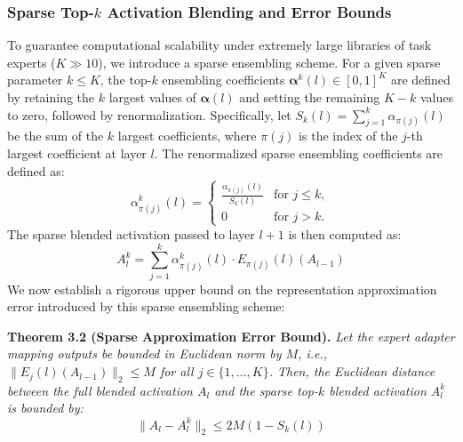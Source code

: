 \subsubsection{Sparse Top-$k$ Activation Blending and Error Bounds}
To guarantee computational scalability under extremely large libraries of task experts ($K \gg 10$), we introduce a sparse ensembling scheme. For a given sparse parameter $k \le K$, the top-$k$ ensembling coefficients $\boldsymbol{\alpha}^k(l) \in [0, 1]^K$ are defined by retaining the $k$ largest values of $\boldsymbol{\alpha}(l)$ and setting the remaining $K-k$ values to zero, followed by renormalization. Specifically, let $S_k(l) = \sum_{j=1}^k \alpha_{\pi(j)}(l)$ be the sum of the $k$ largest coefficients, where $\pi(j)$ is the index of the $j$-th largest coefficient at layer $l$. The renormalized sparse ensembling coefficients are defined as:
\begin{equation}
\label{eq:sparse_coefficients}
\alpha^k_{\pi(j)}(l) = \begin{cases} 
\frac{\alpha_{\pi(j)}(l)}{S_k(l)} & \text{for } j \le k, \\
0 & \text{for } j > k.
\end{cases}
\end{equation}
The sparse blended activation passed to layer $l+1$ is then computed as:
\begin{equation}
\label{eq:sparse_activation_blending}
A^k_l = \sum_{j=1}^k \alpha^k_{\pi(j)}(l) \cdot E_{\pi(j)}(l)(A_{l-1})
\end{equation}
We now establish a rigorous upper bound on the representation approximation error introduced by this sparse ensembling scheme:

\textbf{Theorem 3.2 (Sparse Approximation Error Bound).} \emph{Let the expert adapter mapping outputs be bounded in Euclidean norm by $M$, i.e., $\|E_j(l)(A_{l-1})\|_2 \le M$ for all $j \in \{1, \dots, K\}$. Then, the Euclidean distance between the full blended activation $A_l$ and the sparse top-$k$ blended activation $A^k_l$ is bounded by:}
\begin{equation}
\label{eq:sparse_error_bound}
\|A_l - A^k_l\|_2 \le 2 M (1 - S_k(l))
\end{equation}

